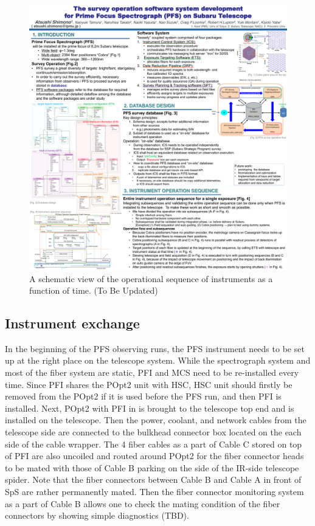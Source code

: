 \documentclass[a4paper]{article}
\begin{document}
\begin{figure}[!htb]
\begin{center}
\includegraphics[scale=0.5]{./figures/PFS_Operational_Sequence_for_Single_Exposure_SPIE2016.pdf}
\end{center}
\caption{A schematic view of the operational sequence of instruments as a function of time. (To Be Updated) \label{fig:single_exposure_sequence1}}
\end{figure}

\subsection{Instrument exchange\label{sec:detail_ope_plan:instrument_exchange}}
In the beginning of the PFS observing runs, the PFS instrument needs
to be set up at the right place on the telescope system. While the
spectrograph system and most of the fiber system are static, PFI and
MCS need to be re-installed every time. Since PFI shares the POpt2
unit with HSC, HSC unit should firstly be removed from the POpt2 if it
is used before the PFS run, and then PFI is installed. Next, POpt2
with PFI in is brought to the telescope top end and is installed on
the telescope. Then the power, coolant, and network cables from the
telescope side are connected to the bulkhead connector box located on
the each side of the cable wrapper. The 4 fiber cables as a part of
Cable C stored on top of PFI are also uncoiled and routed around POpt2
for the fiber connector heads to be mated with those of Cable B
parking on the side of the IR-side telescope spider. Note that the
fiber connectors between Cable B and Cable A in front of SpS are rather
permanently mated. Then the fiber connector monitoring system as a
part of Cable B allows one to check the mating condition of the fiber
connectors by showing simple diagnostics (TBD).
\end{document}
